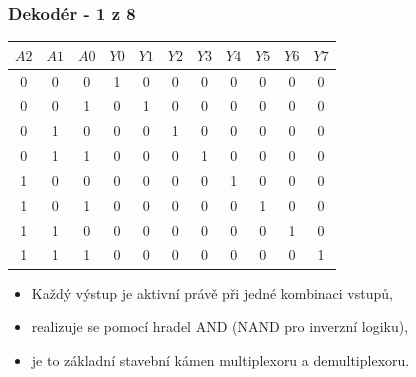 	\begin{frame}
    \frametitle{Dekodér - 1 z 8}

		
		\begin{center}
			\begin{tabular}{ c c c | c c c c c c c c }
			  $A2$ & $A1$ & $A0$ & $Y0$ & $Y1$ & $Y2$ & $Y3$ & $Y4$ & $Y5$ & $Y6$ & $Y7$ \\
				\hline
				0 & 0 & 0 &  1 & 0 & 0 & 0 & 0 & 0 & 0 & 0 \\
				0 & 0 & 1 &  0 & 1 & 0 & 0 & 0 & 0 & 0 & 0 \\
				0 & 1 & 0 &  0 & 0 & 1 & 0 & 0 & 0 & 0 & 0 \\
				0 & 1 & 1 &  0 & 0 & 0 & 1 & 0 & 0 & 0 & 0 \\
				1 & 0 & 0 &  0 & 0 & 0 & 0 & 1 & 0 & 0 & 0 \\
				1 & 0 & 1 &  0 & 0 & 0 & 0 & 0 & 1 & 0 & 0 \\
				1 & 1 & 0 &  0 & 0 & 0 & 0 & 0 & 0 & 1 & 0 \\
				1 & 1 & 1 &  0 & 0 & 0 & 0 & 0 & 0 & 0 & 1 \\
			\end{tabular}
		\end{center}
		
		\begin{itemize}
			\item Každý výstup je aktivní právě při jedné kombinaci vstupů,
			\item realizuje se pomocí hradel AND (NAND pro inverzní logiku),
			\item je to základní stavební kámen multiplexoru a demultiplexoru.
		\end{itemize}
		
	\end{frame}
	
